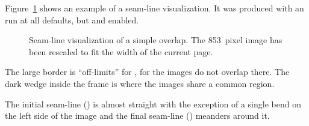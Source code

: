 Figure~\ref{fig:seam-line-visualization} shows an
example%
%
of a seam-line visualization.  It was produced with an \App{} run at
all defaults, but  and 
enabled.

\begin{figure}[htbp]
  \begin{maxipage}
    \centering
  \end{maxipage}

  \caption[Seam-line visualization]{Seam-line visualization of a
    simple overlap.  \ifhevea \relax\else The
    853~pixel image has been rescaled to fit the width
    of the current page.\fi\label{fig:seam-line-visualization}}
\end{figure}

The large  border is
``off-limits'' for \App, for the images do not overlap there.  The
dark wedge inside the 
frame is where the images share a common region.

The initial seam-line () is almost
straight with the exception of a single bend on the left side of the
image and the final seam-line
() meanders around it.
